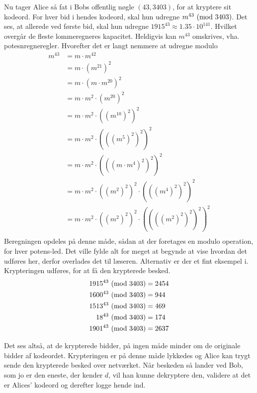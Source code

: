 Nu tager Alice så fat i Bobs offentlig nøgle \((43, 3403)\), for at kryptere sit kodeord.
For hver bid i hendes kodeord, skal hun udregne \(m^{43} \ (\mathrm{mod}\ 3403)\).
Det ses, at allerede ved første bid, skal hun udregne \(1915^{43} \approx 1.35 \cdot 10^{141}\).
Hvilket overgår de fleste lommeregneres kapacitet.
Heldigvis kan \(m^{43}\) omskrives, vha. potesnregneregler. Hvorefter det er langt nemmere at udregne modulo
\begin{align*}
m^{43} &= m \cdot m^{42}\\
       &= m \cdot (m^{21})^2\\
       &= m \cdot (m \cdot m^{20})^2\\
       &= m \cdot m^2 \cdot (m^{20})^2\\
       &= m \cdot m^2 \cdot ((m^{10})^2)^2\\
       &= m \cdot m^2 \cdot (((m^5)^2)^2)^2\\
       &= m \cdot m^2 \cdot (((m \cdot m^4)^2)^2)^2\\
       &= m \cdot m^2 \cdot ((m^2)^2)^2 \cdot (((m^4)^2)^2)^2\\
       &= m \cdot m^2 \cdot ((m^2)^2)^2 \cdot ((((m^2)^2)^2)^2)^2\\
\end{align*}
Beregningen opdeles på denne måde, sådan at der foretages en modulo operation, for hver potens-led.
Det ville fylde alt for meget at begynde at vise hvordan det udføres her, derfor overlades det til læseren. Alternativ er der et fint eksempel i. \cite[104]{krypto}\\

Krypteringen udføres, for at få den krypterede besked.
\begin{align*}
    1915^{43} \ (\mathrm{mod}\ 3403) &= 2454\\
    1600^{43} \ (\mathrm{mod}\ 3403) &= 944\\
    1513^{43} \ (\mathrm{mod}\ 3403) &= 469\\
    18^{43} \ (\mathrm{mod}\ 3403)   &= 174\\
    1901^{43} \ (\mathrm{mod}\ 3403) &= 2637\\
\end{align*}

Det ses altså, at de krypterede bidder, på ingen måde minder om de originale bidder af kodeordet.
Krypteringen er på denne måde lykkedes og Alice kan trygt sende den krypterede besked over netværket.
Når beskeden så lander ved Bob, som jo er den eneste, der kender \(d\), vil han kunne dekryptere den, validere at det er Alices' kodeord og derefter logge hende ind.

